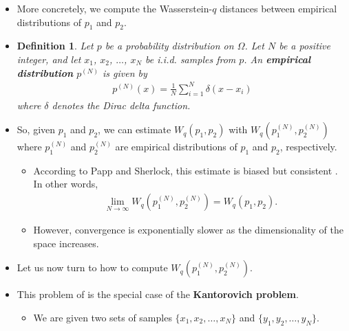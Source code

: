 \documentclass[10pt]{article}
\newtheorem{definition}[lemma]{Definition}
\newcommand{\ra}{\rightarrow}
\begin{document}
\begin{itemize}
    \item More concretely, we compute the Wasserstein-$q$ distances between empirical distributions of $p_1$ and $p_2$.

    \item \begin{definition}
        Let $p$ be a probability distribution on $\Omega$. Let $N$ be a positive integer, and let $x_1$, $x_2$, $\dotsc$, $x_N$ be i.i.d. samples from $p$. An {\bf empirical distribution} $p^{(N)}$ is given by
        \begin{align*}
            p^{(N)}(x) = \frac{1}{N} \sum_{i=1}^N \delta(x - x_i)
        \end{align*}
        where $\delta$ denotes the Dirac delta function.        
    \end{definition}

    \item So, given $p_1$ and $p_2$, we can estimate $W_q(p_1, p_2)$ with $W_q(p^{(N)}_1, p^{(N)}_2)$ where $p^{(N)}_1$ and $p^{(N)}_2$ are empirical distributions of $p_1$ and $p_2$, respectively.

    \begin{itemize}
        \item According to Papp and Sherlock, this estimate is biased but consistent  \cite{Papp:2022}. In other words,
        \begin{align*}
            \lim_{N \ra \infty} W_q(p^{(N)}_1, p^{(N)}_2) = W_q(p_1, p_2).
        \end{align*}

        \item However, convergence is exponentially slower as the dimensionality of the space increases.        
    \end{itemize}    

    \item Let us now turn to how to compute $W_q(p^{(N)}_1, p^{(N)}_2)$. 
    
    \item This problem of is the special case of the {\bf Kantorovich problem}.
    
    \begin{itemize}
        \item We are given two sets of samples $\{ x_1, x_2, \dotsc, x_N \}$ and $\{ y_1, y_2, \dotsc, y_N \}$.
        

\end{itemize}
\end{itemize}
\end{document}
